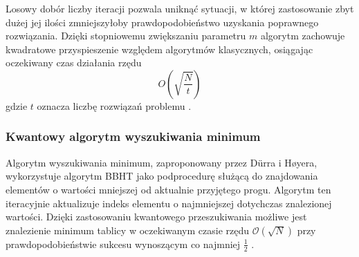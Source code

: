 Losowy dobór liczby iteracji pozwala uniknąć sytuacji, w której zastosowanie zbyt dużej jej ilości zmniejszyłoby prawdopodobieństwo uzyskania poprawnego rozwiązania. Dzięki stopniowemu zwiększaniu parametru $m$ algorytm zachowuje kwadratowe przyspieszenie względem algorytmów klasycznych, osiągając oczekiwany czas działania rzędu
\begin{equation}
\label{eq:bbht_time} 
O\left(\sqrt{\frac{N}{t}}\right)
\end{equation}
gdzie $t$ oznacza liczbę rozwiązań problemu \cite{bbht1996}.


\subsubsection{Kwantowy algorytm wyszukiwania minimum}

Algorytm wyszukiwania minimum, zaproponowany przez Dürra i Høyera, wykorzystuje algorytm BBHT jako podprocedurę służącą do znajdowania elementów o wartości mniejszej od aktualnie przyjętego progu. Algorytm ten iteracyjnie aktualizuje indeks elementu o najmniejszej dotychczas znalezionej wartości. Dzięki zastosowaniu kwantowego przeszukiwania możliwe jest znalezienie minimum tablicy w oczekiwanym czasie rzędu $\mathcal{O}(\sqrt{N})$ przy prawdopodobieństwie sukcesu wynoszącym co najmniej $\frac{1}{2}$ \cite{duerr1996}.

